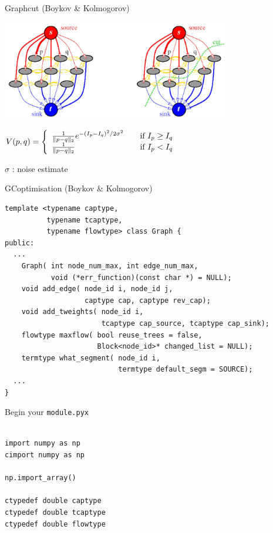 \documentclass[12pt]{beamer}
\begin{document}
\begin{frame}{Graphcut (Boykov \& Kolmogorov)}

\begin{center}
\includegraphics[width=0.75\textwidth]{graphcut.png}

\vspace{0.1\textheight}
{\large

$
 V(p,q) = \left\{ 
  \begin{array}{l l}
    \frac{1}{\|p-q\|_2}e^{ - (I_p - I_q)^2 / 2 \sigma ^ 2 } & \quad \text{if $I_p \ge I_q$}\\
    \frac{1}{\|p-q\|_2} & \quad \text{if $I_p < I_q$}\\
  \end{array} \right.
$
}
\vspace{0.05\textheight}

$\sigma$ : noise estimate
\end{center}
\end{frame}


\begin{frame}[fragile]{GCoptimisation (Boykov \& Kolmogorov)}

\small

\begin{verbatim}
template <typename captype,
          typename tcaptype,
          typename flowtype> class Graph {
public:
  ...
	Graph( int node_num_max, int edge_num_max,
           void (*err_function)(const char *) = NULL);
	void add_edge( node_id i, node_id j,
                   captype cap, captype rev_cap);
	void add_tweights( node_id i,
                       tcaptype cap_source, tcaptype cap_sink);
	flowtype maxflow( bool reuse_trees = false, 
                      Block<node_id>* changed_list = NULL);
	termtype what_segment( node_id i,
                           termtype default_segm = SOURCE);
  ...
}
\end{verbatim}
\end{frame}

\begin{frame}[fragile]{Begin your \texttt{module.pyx}}

\begin{verbatim}

import numpy as np
cimport numpy as np

np.import_array()

ctypedef double captype
ctypedef double tcaptype
ctypedef double flowtype

\end{verbatim}
\end{frame}
\end{document}
